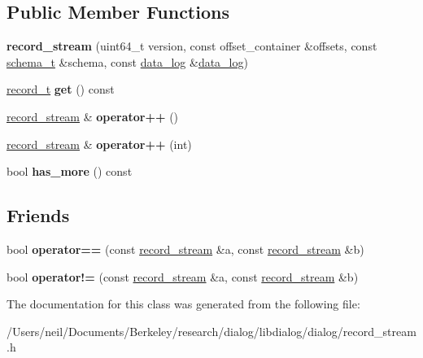 \subsection*{Public Member Functions}
\begin{DoxyCompactItemize}
\item 
\mbox{\label{classdialog_1_1record__stream_a42921aa2b1009eed0c94e4abde6bf11f}} 
{\bfseries record\+\_\+stream} (uint64\+\_\+t version, const offset\+\_\+container \&offsets, const \hyperlink{classdialog_1_1schema__t}{schema\+\_\+t} \&schema, const \hyperlink{classdialog_1_1monolog_1_1monolog__linear}{data\+\_\+log} \&\hyperlink{classdialog_1_1monolog_1_1monolog__linear}{data\+\_\+log})
\item 
\mbox{\label{classdialog_1_1record__stream_a763e108fd83b5371e0abd425cbac1554}} 
\hyperlink{structdialog_1_1record__t}{record\+\_\+t} {\bfseries get} () const
\item 
\mbox{\label{classdialog_1_1record__stream_a809d836d1e0355a80585110449cf28ba}} 
\hyperlink{classdialog_1_1record__stream}{record\+\_\+stream} \& {\bfseries operator++} ()
\item 
\mbox{\label{classdialog_1_1record__stream_a1dad40319a37342cdb1be4dab9d7507d}} 
\hyperlink{classdialog_1_1record__stream}{record\+\_\+stream} \& {\bfseries operator++} (int)
\item 
\mbox{\label{classdialog_1_1record__stream_a5c4e497673511f6744dbadd96e2377fe}} 
bool {\bfseries has\+\_\+more} () const
\end{DoxyCompactItemize}
\subsection*{Friends}
\begin{DoxyCompactItemize}
\item 
\mbox{\label{classdialog_1_1record__stream_ad7a7dec15a4ce64b94d09539f25e5a39}} 
bool {\bfseries operator==} (const \hyperlink{classdialog_1_1record__stream}{record\+\_\+stream} \&a, const \hyperlink{classdialog_1_1record__stream}{record\+\_\+stream} \&b)
\item 
\mbox{\label{classdialog_1_1record__stream_ade8067f06c184a05dd323e726033f4a8}} 
bool {\bfseries operator!=} (const \hyperlink{classdialog_1_1record__stream}{record\+\_\+stream} \&a, const \hyperlink{classdialog_1_1record__stream}{record\+\_\+stream} \&b)
\end{DoxyCompactItemize}


The documentation for this class was generated from the following file\+:\begin{DoxyCompactItemize}
\item 
/\+Users/neil/\+Documents/\+Berkeley/research/dialog/libdialog/dialog/record\+\_\+stream.\+h\end{DoxyCompactItemize}
